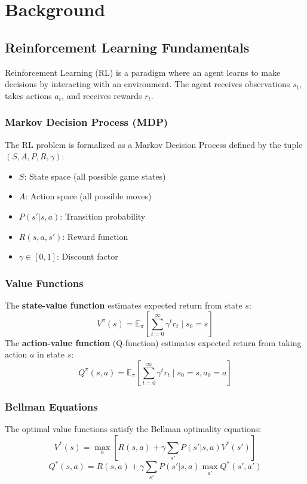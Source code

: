 \documentclass[12pt,a4paper]{article}
\begin{document}
\section{Background}
\label{sec:background}
\subsection{Reinforcement Learning Fundamentals}
Reinforcement Learning (RL) is a paradigm where an agent learns to make decisions by interacting with an environment. The agent receives observations $s_t$, takes actions $a_t$, and receives rewards $r_t$.
\subsubsection{Markov Decision Process (MDP)}
The RL problem is formalized as a Markov Decision Process defined by the tuple $(S, A, P, R, \gamma)$:
\begin{itemize}
    \item $S$: State space (all possible game states)
    \item $A$: Action space (all possible moves)
    \item $P(s'|s,a)$: Transition probability
    \item $R(s,a,s')$: Reward function
    \item $\gamma \in [0,1]$: Discount factor
\end{itemize}
\subsubsection{Value Functions}
The \textbf{state-value function} estimates expected return from state $s$:
\begin{equation}
    V^\pi(s) = \mathbb{E}_\pi \left[ \sum_{t=0}^{\infty} \gamma^t r_t \mid s_0 = s \right]
\end{equation}
The \textbf{action-value function} (Q-function) estimates expected return from taking action $a$ in state $s$:
\begin{equation}
    Q^\pi(s, a) = \mathbb{E}_\pi \left[ \sum_{t=0}^{\infty} \gamma^t r_t \mid s_0 = s, a_0 = a \right]
\end{equation}
\subsubsection{Bellman Equations}
The optimal value functions satisfy the Bellman optimality equations:
\begin{equation}
    V^*(s) = \max_a \left[ R(s,a) + \gamma \sum_{s'} P(s'|s,a) V^*(s') \right]
\end{equation}
\begin{equation}
    Q^*(s,a) = R(s,a) + \gamma \sum_{s'} P(s'|s,a) \max_{a'} Q^*(s',a')
\end{equation}
\end{document}
